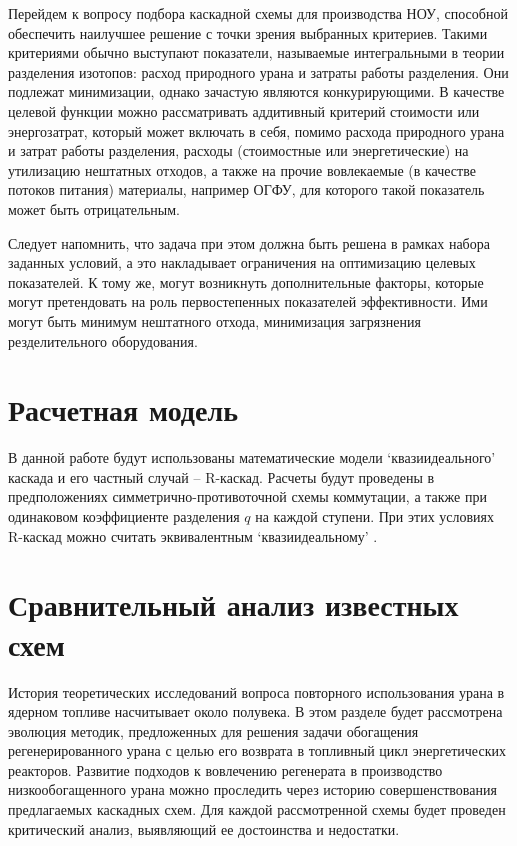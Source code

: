 Перейдем к вопросу подбора каскадной схемы для производства НОУ, способной обеспечить наилучшее решение с точки зрения выбранных критериев.
Такими критериями обычно выступают показатели, называемые интегральными в теории разделения изотопов: расход природного урана и затраты работы разделения.
Они подлежат минимизации, однако зачастую являются конкурирующими.
В качестве целевой функции можно рассматривать аддитивный критерий стоимости или энергозатрат, который может включать в себя, помимо расхода природного урана и затрат работы разделения, расходы (стоимостные или энергетические) на утилизацию нештатных отходов, а также на прочие вовлекаемые (в качестве потоков питания) материалы, например ОГФУ, для которого такой показатель может быть отрицательным.

Следует напомнить, что задача при этом должна быть решена в рамках набора заданных условий, а это накладывает ограничения на оптимизацию целевых показателей.
К тому же, могут возникнуть дополнительные факторы, которые могут претендовать на роль первостепенных показателей эффективности.
Ими могут быть минимум нештатного отхода, минимизация загрязнения резделительного оборудования.

\section{Расчетная модель}

В данной работе будут использованы математические модели  `квазиидеального' каскада и его частный случай -- R-каскад. Расчеты будут проведены в предположениях симметрично-противоточной схемы коммутации, а также при одинаковом коэффициенте разделения $q$ на каждой ступени. При этих условиях R-каскад можно считать эквивалентным `квазиидеальному' \cite{zengRelationshipNonmixingCascade2020}.

\section{Сравнительный анализ известных схем}

История теоретических исследований вопроса повторного использования урана в ядерном топливе насчитывает около полувека.
В этом разделе будет рассмотрена эволюция методик, предложенных для решения задачи обогащения регенерированного урана с целью его возврата в топливный цикл энергетических реакторов.
Развитие подходов к вовлечению регенерата в производство низкообогащенного урана можно проследить через историю совершенствования предлагаемых каскадных схем.
Для каждой рассмотренной схемы будет проведен критический анализ, выявляющий ее достоинства и недостатки.

